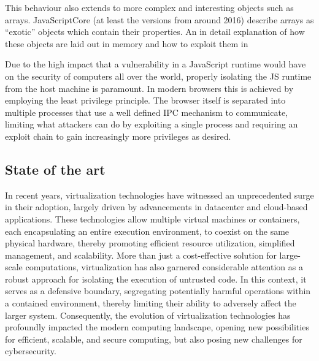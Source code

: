 \documentclass{article}
\begin{document}
This behaviour also extends to more complex and interesting objects such as
arrays. JavaScriptCore (at least the versions from around 2016) describe arrays
as ``exotic'' objects which contain their properties. An in detail explanation
of how these objects are laid out in memory and how to exploit them in\cite{paper
frakck}

Due to the high impact that a vulnerability in a JavaScript runtime would have
on the security of computers all over the world, properly isolating the JS runtime
from the host machine is paramount. In modern browsers this is achieved by
employing the least privilege principle. The browser itself is separated into
multiple processes that use a well defined IPC mechanism to communicate, limiting
what attackers can do by exploiting a single process and requiring an exploit
chain to gain increasingly more privileges as desired.

\subsection{State of the art}
\begin{comment}
  Rise of the hypervizor exploits (showcase some virtualbox exploits, maybe
  vmware hyperv) RCE Exploits mostly slowing down Common techniques no longer
  being effective (check offbyonesec talk about windows kernel exploitation, talk
  about)
\end{comment}
In recent years, virtualization technologies have witnessed an unprecedented
surge in their adoption, largely driven by advancements in datacenter and
cloud-based applications. These technologies allow multiple virtual machines or
containers, each encapsulating an entire execution environment, to coexist on
the same physical hardware, thereby promoting efficient resource utilization,
simplified management, and scalability. More than just a cost-effective solution
for large-scale computations, virtualization has also garnered considerable
attention as a robust approach for isolating the execution of untrusted code. In
this context, it serves as a defensive boundary, segregating potentially harmful
operations within a contained environment, thereby limiting their ability to
adversely affect the larger system. Consequently, the evolution of
virtualization technologies has profoundly impacted the modern computing
landscape, opening new possibilities for efficient, scalable, and secure
computing, but also posing new challenges for cybersecurity.
\end{document}
